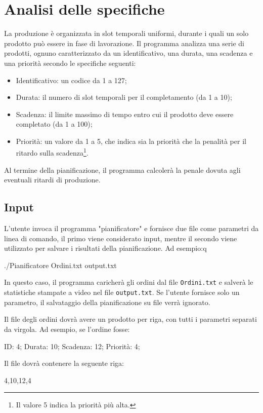 \documentclass[a4paper]{report}
\begin{document}
\section{Analisi delle specifiche}
La produzione è organizzata in slot temporali uniformi, durante i quali un solo prodotto può essere in fase di lavorazione. Il programma analizza una serie di prodotti, ognuno caratterizzato da un identificativo, una durata, una scadenza e una priorità secondo le specifiche seguenti:
\begin{itemize}
  \item Identificativo: un codice da 1 a 127;
  \item Durata: il numero di slot temporali per il completamento (da 1 a 10);
  \item Scadenza: il limite massimo di tempo entro cui il prodotto deve essere completato (da 1 a 100);
  \item Priorità: un valore da 1 a 5, che indica sia la priorità che la penalità per il ritardo sulla scadenza\footnote{Il valore 5 indica la priorità più alta.}.
\end{itemize}
Al termine della pianificazione, il programma calcolerà la penale dovuta agli eventuali ritardi di produzione.

\subsection{Input}
L'utente invoca il programma "pianificatore" e fornisce due file come parametri da linea di comando, il primo viene considerato input, mentre il secondo viene utilizzato per salvare i risultati della pianificazione. Ad esempio:q\
\begin{myverbatim}
./Pianificatore Ordini.txt output.txt
\end{myverbatim}
In questo caso, il programma caricherà gli ordini dal file \texttt{Ordini.txt} e salverà le statistiche stampate a video nel file \texttt{output.txt}.
Se l'utente fornisce solo un parametro, il salvataggio della pianificazione su file verrà ignorato.

Il file degli ordini dovrà avere un prodotto per riga, con tutti i parametri separati da virgola. Ad esempio, se l'ordine fosse:
\begin{myverbatim}
ID: 4; Durata: 10; Scadenza: 12; Priorità: 4;
\end{myverbatim}
Il file dovrà contenere la seguente riga:
\begin{myverbatim}
4,10,12,4
\end{myverbatim}
\end{document}
